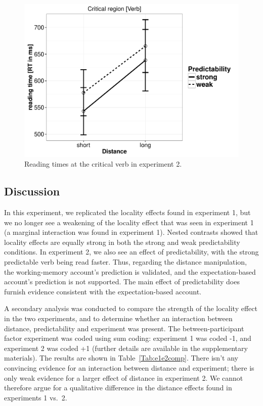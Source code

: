 \documentclass{frontiersSCNS}\usepackage{knitr} %
\begin{document}
\begin{figure}[!htbp]
\begin{knitrout}
\color{fgcolor}

{\centering \includegraphics[width=\maxwidth]{Figures/SafaviEtAlfigureplotexpt2-1} 

}



\end{knitrout}
\caption{Reading times at the critical verb in experiment 2.}\label{fig:SPR2-interaction}
\end{figure}



\subsection{Discussion}

In this experiment, we replicated the locality effects found in experiment 1, but we no longer see a weakening of the locality effect that was seen in experiment 1 (a marginal interaction was found in experiment 1). Nested contrasts showed that locality effects are equally strong in both the strong and weak predictability conditions. In experiment 2, we also see an effect of predictability, with the strong predictable verb being read faster.  Thus, regarding the distance manipulation, the working-memory account's prediction is validated, and the expectation-based account's prediction is not supported. The main effect of predictability does furnish evidence consistent with the expectation-based account.

A secondary analysis was conducted to compare the strength of the locality effect in the two experiments, and to determine whether an interaction between distance, predictability and experiment was present. The between-participant factor experiment was coded using sum coding: experiment 1 was coded -1, and experiment 2 was coded +1 (further details are available in the supplementary materials). The results are shown in Table~\ref{Tab:e1e2comp}. There isn't any convincing evidence for an interaction between distance and experiment; there is only weak evidence for a larger effect of distance in experiment 2. We cannot therefore argue for a qualitative difference in the distance effects found in experiments 1 vs.\ 2.
\end{document}
